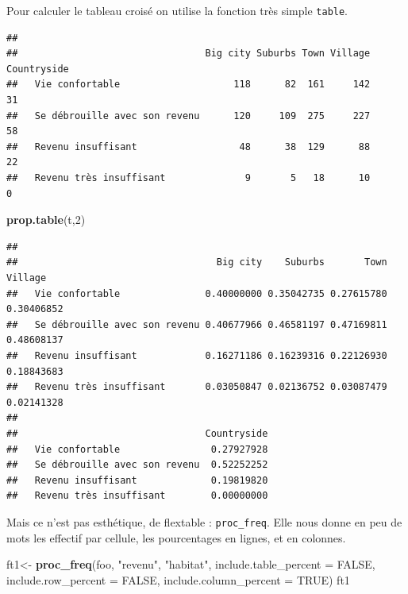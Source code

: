 \documentclass[
]{book}
\newenvironment{Shaded}{\begin{snugshade}}{\end{snugshade}}
\newcommand{\DataTypeTok}[1]{\textcolor[rgb]{0.13,0.29,0.53}{#1}}
\newcommand{\DecValTok}[1]{\textcolor[rgb]{0.00,0.00,0.81}{#1}}
\newcommand{\KeywordTok}[1]{\textcolor[rgb]{0.13,0.29,0.53}{\textbf{#1}}}
\newcommand{\NormalTok}[1]{#1}
\newcommand{\OperatorTok}[1]{\textcolor[rgb]{0.81,0.36,0.00}{\textbf{#1}}}
\newcommand{\OtherTok}[1]{\textcolor[rgb]{0.56,0.35,0.01}{#1}}
\newcommand{\StringTok}[1]{\textcolor[rgb]{0.31,0.60,0.02}{#1}}
\begin{document}
Pour calculer le tableau croisé on utilise la fonction très simple \texttt{table}.

\begin{Shaded}
\end{Shaded}

\begin{verbatim}
##                                
##                                 Big city Suburbs Town Village Countryside
##   Vie confortable                    118      82  161     142          31
##   Se débrouille avec son revenu      120     109  275     227          58
##   Revenu insuffisant                  48      38  129      88          22
##   Revenu très insuffisant              9       5   18      10           0
\end{verbatim}

\begin{Shaded}
\begin{Highlighting}[]
\KeywordTok{prop.table}\NormalTok{(t,}\DecValTok{2}\NormalTok{)}
\end{Highlighting}
\end{Shaded}

\begin{verbatim}
##                                
##                                   Big city    Suburbs       Town    Village
##   Vie confortable               0.40000000 0.35042735 0.27615780 0.30406852
##   Se débrouille avec son revenu 0.40677966 0.46581197 0.47169811 0.48608137
##   Revenu insuffisant            0.16271186 0.16239316 0.22126930 0.18843683
##   Revenu très insuffisant       0.03050847 0.02136752 0.03087479 0.02141328
##                                
##                                 Countryside
##   Vie confortable                0.27927928
##   Se débrouille avec son revenu  0.52252252
##   Revenu insuffisant             0.19819820
##   Revenu très insuffisant        0.00000000
\end{verbatim}

Mais ce n'est pas esthétique, de flextable : \texttt{proc\_freq}. Elle nous donne en peu de mots les effectif par cellule, les pourcentages en lignes, et en colonnes.

\begin{Shaded}
\begin{Highlighting}[]
\NormalTok{ft1<-}\StringTok{ }\KeywordTok{proc_freq}\NormalTok{(foo, }\StringTok{"revenu"}\NormalTok{, }\StringTok{"habitat"}\NormalTok{, }\DataTypeTok{include.table_percent =} \OtherTok{FALSE}\NormalTok{,}
                \DataTypeTok{include.row_percent =} \OtherTok{FALSE}\NormalTok{,}
  \DataTypeTok{include.column_percent =} \OtherTok{TRUE}\NormalTok{)}
\NormalTok{ft1}
\end{Highlighting}
\end{Shaded}
\end{document}
